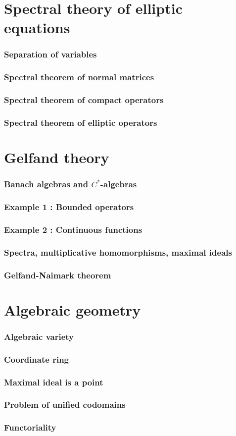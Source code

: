 \documentclass{beamer}
\begin{document}
\section{Spectral theory of elliptic equations}
\begin{frame}
\frametitle{Separation of variables}
\end{frame}
\begin{frame}
\frametitle{Spectral theorem of normal matrices}
\end{frame}
\begin{frame}
\frametitle{Spectral theorem of compact operators}
\end{frame}
\begin{frame}
\frametitle{Spectral theorem of elliptic operators}
\end{frame}


\section{Gelfand theory}
\begin{frame}
\frametitle{Banach algebras and $C^*$-algebras}
\end{frame}
\begin{frame}
\frametitle{Example 1 : Bounded operators}
\end{frame}
\begin{frame}
\frametitle{Example 2 : Continuous functions}
\end{frame}
\begin{frame}
\frametitle{Spectra, multiplicative homomorphisms, maximal ideals}
\end{frame}
\begin{frame}
\frametitle{Gelfand-Naimark theorem}
\end{frame}


\section{Algebraic geometry}
\begin{frame}
\frametitle{Algebraic variety}
\end{frame}
\begin{frame}
\frametitle{Coordinate ring}
\end{frame}
\begin{frame}
\frametitle{Maximal ideal is a point}
\end{frame}
\begin{frame}
\frametitle{Problem of unified codomains}
\end{frame}
\begin{frame}
\frametitle{Functoriality}
\end{frame}
\end{document}
